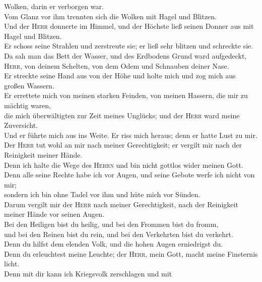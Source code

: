 Wolken, darin er verborgen war.\\
 Vom Glanz vor ihm trennten sich die Wolken mit Hagel und
Blitzen.\\
 Und der \textsc{Herr} donnerte im Himmel, und der
Höchste ließ seinen Donner aus mit Hagel und Blitzen.\\
 Er schoss seine Strahlen und zerstreute sie; er ließ
sehr blitzen und schreckte sie.\\
 Da sah man das Bett der Wasser, und des Erdbodens Grund
ward aufgedeckt, \textsc{Herr}, von deinem Schelten, von dem Odem und
Schnauben deiner Nase.\\
 Er streckte seine Hand aus von der Höhe und holte mich
und zog mich aus großen Wassern.\\
 Er errettete mich von meinen starken Feinden, von meinen
Hassern, die mir zu mächtig waren,\\
 die mich überwältigten zur Zeit meines Unglücks; und der
\textsc{Herr} ward meine Zuversicht.\\
 Und er führte mich aus ins Weite. Er riss mich heraus;
denn er hatte Lust zu mir.\\
 Der \textsc{Herr} tut wohl an mir nach meiner
Gerechtigkeit; er vergilt mir nach der Reinigkeit meiner Hände.\\
 Denn ich halte die Wege des \textsc{Herrn} und bin nicht
gottlos wider meinen Gott.\\
 Denn alle seine Rechte habe ich vor Augen, und seine
Gebote werfe ich nicht von mir;\\
 sondern ich bin ohne Tadel vor ihm und hüte mich vor
Sünden.\\
 Darum vergilt mir der \textsc{Herr} nach meiner
Gerechtigkeit, nach der Reinigkeit meiner Hände vor seinen Augen.\\
 Bei den Heiligen bist du heilig, und bei den Frommen
bist du fromm,\\
 und bei den Reinen bist du rein, und bei den Verkehrten
bist du verkehrt.\\
 Denn du hilfst dem elenden Volk, und die hohen Augen
erniedrigst du.\\
 Denn du erleuchtest meine Leuchte; der \textsc{Herr},
mein Gott, macht meine Finsternis licht.\\
 Denn mit dir kann ich Kriegsvolk zerschlagen und mit
